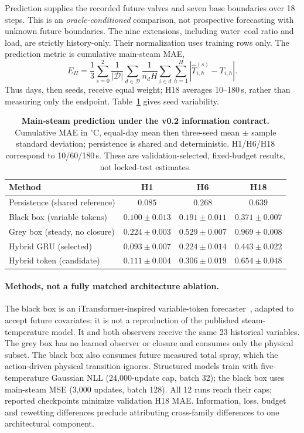 \documentclass{article}
\newcommand{\degc}{\ensuremath{^{\circ}\mathrm{C}}}
\begin{document}
Prediction supplies the recorded future valves and seven base boundaries over
18 steps. This is an \emph{oracle-conditioned} comparison, not prospective
forecasting with unknown future boundaries. The nine extensions, including
water--coal ratio and load, are strictly history-only. Their normalization uses
training rows only. The prediction metric is cumulative main-steam MAE,
\begin{equation}
E_H=\frac{1}{3}\sum_{s=0}^2\frac{1}{|\mathcal D|}\sum_{d\in\mathcal D}
\frac{1}{n_d H}\sum_{i\in d}\sum_{h=1}^{H}|\hat T^{(s)}_{i,h}-T_{i,h}|.
\label{eq:metric}
\end{equation}
Thus days, then seeds, receive equal weight; H18 averages 10--180\,s, rather than
measuring only the endpoint. Table~\ref{tab:prediction} gives seed variability.

\begin{table}[!ht]
\centering\small
\begin{tabular}{lccc}
\toprule
Method & H1 & H6 & H18\\
\midrule
Persistence (shared reference) & $0.085$ & $0.268$ & $0.639$\\
Black box (variable tokens) & $0.100\pm0.013$ & $0.191\pm0.011$ & $0.371\pm0.007$\\
Grey box (steady, no closure) & $0.224\pm0.003$ & $0.529\pm0.007$ & $0.969\pm0.008$\\
Hybrid GRU (selected) & $0.093\pm0.007$ & $0.224\pm0.014$ & $0.443\pm0.022$\\
Hybrid token (candidate) & $0.111\pm0.004$ & $0.306\pm0.019$ & $0.654\pm0.048$\\
\bottomrule
\end{tabular}
\caption{\textbf{Main-steam prediction under the v0.2 information contract.}
Cumulative MAE in \degc{}, equal-day mean then three-seed mean $\pm$ sample
standard deviation; persistence is shared and deterministic. H1/H6/H18 correspond to 10/60/180\,s. These are
validation-selected, fixed-budget results, not locked-test estimates.}
\label{tab:prediction}
\end{table}

\paragraph{Methods, not a fully matched architecture ablation.}
The black box is an iTransformer-inspired variable-token forecaster~\cite{liu2024itransformer},
adapted to accept future covariates; it is not a reproduction of the published
steam-temperature model. It and both observers receive the same 23 historical
variables. The grey box has no learned observer or closure and consumes only
the physical subset. The black box also consumes future measured total spray,
which the action-driven physical transition ignores. Structured models train
with five-temperature Gaussian NLL (24,000-update cap, batch 32); the black box
uses main-steam MSE (3,000 updates, batch 128). All 12 runs reach their caps;
reported checkpoints minimize validation H18 MAE. Information, loss, budget
and rewetting differences preclude attributing cross-family differences to
one architectural component.
\end{document}
